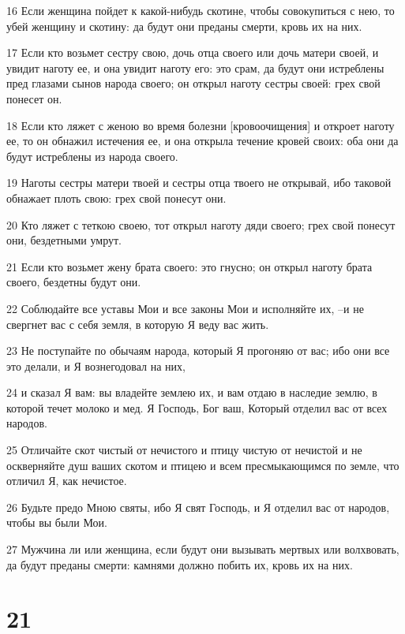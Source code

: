 \par 16 Если женщина пойдет к какой-нибудь скотине, чтобы совокупиться с нею, то убей женщину и скотину: да будут они преданы смерти, кровь их на них.
\par 17 Если кто возьмет сестру свою, дочь отца своего или дочь матери своей, и увидит наготу ее, и она увидит наготу его: это срам, да будут они истреблены пред глазами сынов народа своего; он открыл наготу сестры своей: грех свой понесет он.
\par 18 Если кто ляжет с женою во время болезни [кровоочищения] и откроет наготу ее, то он обнажил истечения ее, и она открыла течение кровей своих: оба они да будут истреблены из народа своего.
\par 19 Наготы сестры матери твоей и сестры отца твоего не открывай, ибо таковой обнажает плоть свою: грех свой понесут они.
\par 20 Кто ляжет с теткою своею, тот открыл наготу дяди своего; грех свой понесут они, бездетными умрут.
\par 21 Если кто возьмет жену брата своего: это гнусно; он открыл наготу брата своего, бездетны будут они.
\par 22 Соблюдайте все уставы Мои и все законы Мои и исполняйте их, --и не свергнет вас с себя земля, в которую Я веду вас жить.
\par 23 Не поступайте по обычаям народа, который Я прогоняю от вас; ибо они все это делали, и Я вознегодовал на них,
\par 24 и сказал Я вам: вы владейте землею их, и вам отдаю в наследие землю, в которой течет молоко и мед. Я Господь, Бог ваш, Который отделил вас от всех народов.
\par 25 Отличайте скот чистый от нечистого и птицу чистую от нечистой и не оскверняйте душ ваших скотом и птицею и всем пресмыкающимся по земле, что отличил Я, как нечистое.
\par 26 Будьте предо Мною святы, ибо Я свят Господь, и Я отделил вас от народов, чтобы вы были Мои.
\par 27 Мужчина ли или женщина, если будут они вызывать мертвых или волхвовать, да будут преданы смерти: камнями должно побить их, кровь их на них.

\chapter{21}

